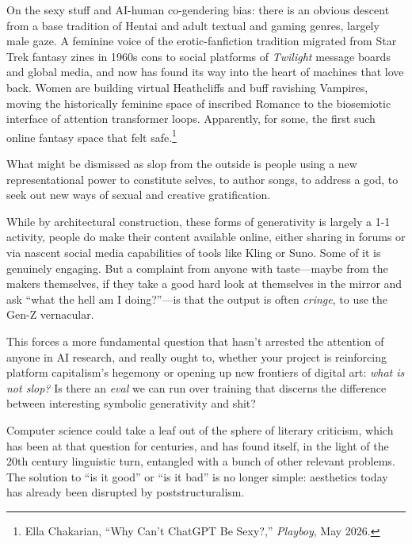 On the sexy stuff and AI-human co-gendering bias: there is an obvious descent from a base tradition of Hentai and adult textual and gaming genres, largely male gaze. A feminine voice of the erotic-fanfiction tradition migrated from Star Trek fantasy zines in 1960s cons to social platforms of \emph{Twilight} message boards and global media, and now has found its way into the heart of machines that love back. Women are building virtual Heathcliffs and buff ravishing Vampires, moving the historically feminine space of inscribed Romance to the biosemiotic interface of attention transformer loops. Apparently, for some, the first such online fantasy space that felt safe.\footnote{Ella Chakarian, ``Why Can't ChatGPT Be Sexy?,'' \emph{Playboy}, May 2026.}

What might be dismissed as slop from the outside is people using a new representational power to constitute selves, to author songs, to address a god, to seek out new ways of sexual and creative gratification. 













While by architectural construction, these forms of generativity is largely a 1-1 activity, people do make their content available online, either sharing in forums or via nascent social media capabilities of tools like Kling or Suno. Some of it is genuinely engaging. But a complaint from anyone with taste---maybe from the makers themselves, if they take a good hard look at themselves in the mirror and ask ``what the hell am I doing?''---is that the output is often \textit{cringe}, to use the Gen-Z vernacular.

This forces a more fundamental question that hasn't arrested the attention of anyone in AI research, and really ought to, whether your project is reinforcing platform capitalism's hegemony or opening up new frontiers of digital art: \textit{what is not slop?} Is there an \textit{eval} we can run over training that discerns the difference between interesting symbolic generativity and shit? 

Computer science could take a leaf out of the sphere of literary criticism, which has been at that question for centuries, and has found itself, in the light of the 20th century linguistic turn, entangled with a bunch of other relevant problems. The solution to ``is it good'' or ``is it bad'' is no longer simple: aesthetics today has already been disrupted by poststructuralism.




